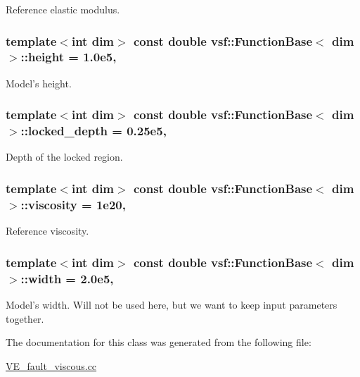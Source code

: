 Reference elastic modulus. \hypertarget{classvsf_1_1FunctionBase_acfffb54eadb79217d150a73e3797b25a}{
\subsubsection[{height}]{\setlength{\rightskip}{0pt plus 5cm}template$<$int dim$>$ const double {\bf vsf\-::\-Function\-Base}$<$ dim $>$\-::height = 1.\-0e5\hspace{0.3cm}{\ttfamily [static]}, {\ttfamily [protected]}}}\label{classvsf_1_1FunctionBase_acfffb54eadb79217d150a73e3797b25a}
Model's height. \hypertarget{classvsf_1_1FunctionBase_ae06ffa81ca26e9ead535d50596d852c1}{
\subsubsection[{locked\-\_\-depth}]{\setlength{\rightskip}{0pt plus 5cm}template$<$int dim$>$ const double {\bf vsf\-::\-Function\-Base}$<$ dim $>$\-::locked\-\_\-depth = 0.\-25e5\hspace{0.3cm}{\ttfamily [static]}, {\ttfamily [protected]}}}\label{classvsf_1_1FunctionBase_ae06ffa81ca26e9ead535d50596d852c1}
Depth of the locked region. \hypertarget{classvsf_1_1FunctionBase_af8a2b8711f526a821e1a37a396c9b48f}{
\subsubsection[{viscosity}]{\setlength{\rightskip}{0pt plus 5cm}template$<$int dim$>$ const double {\bf vsf\-::\-Function\-Base}$<$ dim $>$\-::viscosity = 1e20\hspace{0.3cm}{\ttfamily [static]}, {\ttfamily [protected]}}}\label{classvsf_1_1FunctionBase_af8a2b8711f526a821e1a37a396c9b48f}
Reference viscosity. \hypertarget{classvsf_1_1FunctionBase_ad2bf6791357d301b7d838b6188ef646e}{
\subsubsection[{width}]{\setlength{\rightskip}{0pt plus 5cm}template$<$int dim$>$ const double {\bf vsf\-::\-Function\-Base}$<$ dim $>$\-::width = 2.\-0e5\hspace{0.3cm}{\ttfamily [static]}, {\ttfamily [protected]}}}\label{classvsf_1_1FunctionBase_ad2bf6791357d301b7d838b6188ef646e}
Model's width. Will not be used here, but we want to keep input parameters together. 

The documentation for this class was generated from the following file\-:\begin{DoxyCompactItemize}
\item 
\hyperlink{VE__fault__viscous_8cc}{V\-E\-\_\-fault\-\_\-viscous.\-cc}\end{DoxyCompactItemize}
